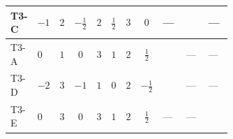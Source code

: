 \documentclass[8pt]{article}
\begin{document}
\begin{landscape}
\begin{longtable}{@{}llcccccc >{\raggedright\arraybackslash}p{0.21\linewidth} >{\raggedright\arraybackslash}p{0.21\linewidth} >{\raggedright\arraybackslash}p{0.21\linewidth}@{}}
\midrule
T3-C & $-1$ & $2$ & $-\frac{1}{2}$ & $2$ & $\frac{1}{2}$ & $3$ & $0$ & --- & \scriptsize\adjustbox{max width=\linewidth}{$\begin{gathered} - \frac{2 i lambdaT_{3} \overline{y_{1}} \overline{y_{2}}}{3 MF}\end{gathered}$} & --- \\
\midrule
T3-A & $0$ & $1$ & $0$ & $3$ & $1$ & $2$ & $\frac{1}{2}$ & \scriptsize\adjustbox{max width=\linewidth}{$\begin{gathered} \frac{2 \sqrt{3} i lambdaT_{3} \overline{y_{1}} \overline{y_{2}}}{3 MF}\end{gathered}$} & --- & --- \\
\midrule
T3-D & $-2$ & $3$ & $-1$ & $1$ & $0$ & $2$ & $-\frac{1}{2}$ & \scriptsize\adjustbox{max width=\linewidth}{$\begin{gathered} \frac{2 \sqrt{3} i lambdaT_{3} \overline{y_{1}} \overline{y_{2}}}{3 MF}\end{gathered}$} & --- & --- \\
\midrule
T3-E & $0$ & $3$ & $0$ & $3$ & $1$ & $2$ & $\frac{1}{2}$ & --- & --- & \scriptsize\adjustbox{max width=\linewidth}{$\begin{gathered} - \frac{2 \sqrt{6} i lambdaT_{3} \overline{y_{1}} \overline{y_{2}}}{3 MF}\end{gathered}$} \\
\midrule
\bottomrule
\end{longtable}
\clearpage

\end{landscape}
\end{document}
